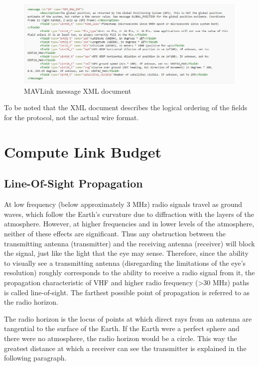 \begin{figure}[h]
	\centering
	\includegraphics[scale=0.5]{figures/mavlink_msg.jpg}
	\caption{MAVLink message XML document}
	\label{fig:mav_msg}
\end{figure}

To be noted that the XML document describes the logical ordering of the fields for the protocol, not the actual wire format.


\section{Compute Link Budget}

\subsection{Line-Of-Sight Propagation}\label{subsec:los_propagation}
At low frequency (below approximately 3 MHz) radio signals travel as ground waves, which follow the Earth's curvature due to diffraction with the layers of the atmosphere.
However, at higher frequencies and in lower levels of the atmosphere, neither of these effects are significant. Thus any obstruction between the transmitting antenna (transmitter) and the receiving antenna (receiver) will block the signal, just like the light that the eye may sense. Therefore, since the ability to visually see a transmitting antenna (disregarding the limitations of the eye's resolution) roughly corresponds to the ability to receive a radio signal from it, the propagation characteristic of VHF and higher radio frequency (>30 MHz) paths is called line-of-sight. The farthest possible point of propagation is referred to as the radio horizon.

The radio horizon is the locus of points at which direct rays from an antenna are tangential to the surface of the Earth. If the Earth were a perfect sphere and there were no atmosphere, the radio horizon would be a circle.
This way the greatest distance at which a receiver can see the transmitter is explained in the following paragraph.

